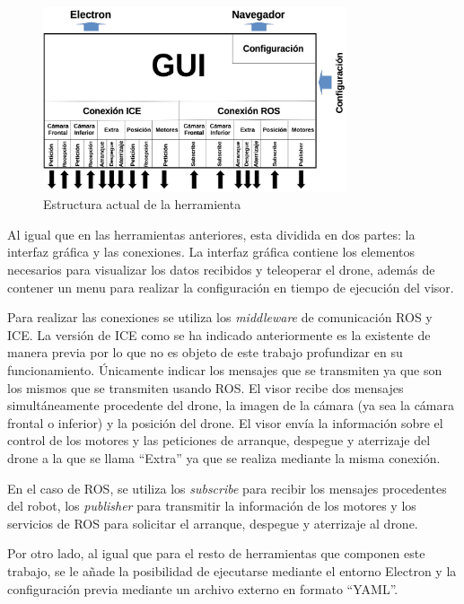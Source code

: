 \begin{figure}[H]
  \begin{center}
    \includegraphics[width=0.8\textwidth]{figures/estrucuturadroneviz2.png}
		\caption{Estructura actual de la herramienta}
		\label{fig.estructuracamviz2}
		\end{center}
\end{figure}

Al igual que en las herramientas anteriores, esta dividida en dos partes: la interfaz gráfica y las conexiones. La interfaz gráfica contiene los elementos necesarios para visualizar los datos recibidos y teleoperar el drone, además de contener un menu para realizar la configuración en tiempo de ejecución del visor.

Para realizar las conexiones se utiliza los \textit{middleware} de comunicación ROS y ICE. La versión de ICE como se ha indicado anteriormente es la existente de manera previa por lo que no es objeto de este trabajo profundizar en su funcionamiento. Únicamente indicar los mensajes que se transmiten ya que son los mismos que se transmiten usando ROS. El visor recibe dos mensajes simultáneamente procedente del drone, la imagen de la cámara (ya sea la cámara frontal o inferior) y la posición del drone. El visor envía la información sobre el control de los motores y las peticiones de arranque, despegue y aterrizaje del drone a la que se llama ``Extra'' ya que se realiza mediante la misma conexión.

En el caso de ROS, se utiliza los \textit{subscribe} para recibir los mensajes procedentes del robot, los \textit{publisher} para transmitir la información de los motores y los servicios de ROS para solicitar el arranque, despegue y aterrizaje al drone.

Por otro lado, al igual que para el resto de herramientas que componen este trabajo, se le añade la posibilidad de ejecutarse mediante el entorno Electron y la configuración previa mediante un archivo externo en formato ``YAML''.

